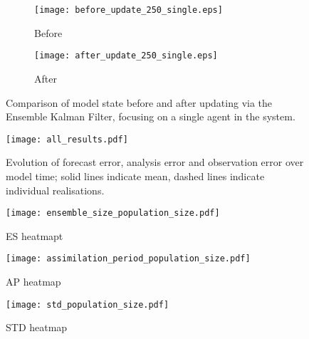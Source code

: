 \begin{figure}[!htb]
    \centering
    \begin{subfigure}[h]{\textwidth}
        \texttt{[image: before\_update\_250\_single.eps]}
        \caption{Before}\label{fig:before_250_single}
    \end{subfigure}

    \begin{subfigure}[h]{\textwidth}
        \texttt{[image: after\_update\_250\_single.eps]}
        \caption{After}\label{fig:after_250_single}
    \end{subfigure}
    \caption{Comparison of model state before and after updating via the
    Ensemble Kalman Filter, focusing on a single agent in the system.}
    \label{fig:250_single}
\end{figure}

\begin{figure}[!htb]
    \centering
    \texttt{[image: all\_results.pdf]}
    \caption{Evolution of forecast error, analysis error and observation error
    over model time; solid lines indicate mean, dashed lines indicate individual
realisations.}\label{fig:error_evolution}
\end{figure}

\begin{figure}[!htb]
    \centering
    \texttt{[image: ensemble\_size\_population\_size.pdf]}
    \caption{ES heatmapt}\label{fig:es_heatmap}
\end{figure}

\begin{figure}[!htb]
    \centering
    \texttt{[image: assimilation\_period\_population\_size.pdf]}
    \caption{AP heatmap}\label{fig:ap_heatmap}
\end{figure}

\begin{figure}[!htb]
    \centering
    \texttt{[image: std\_population\_size.pdf]}
    \caption{STD heatmap}\label{fig:std_heatmap}
\end{figure}

